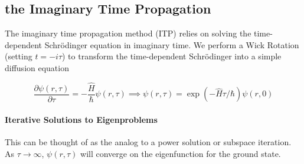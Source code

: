 \documentclass[a0b,landscape]{a0poster}
\begin{document}
\vspace{1cm} %


\begin{multicols}{3} %



\color{Black} %

\section*{the Imaginary Time Propagation}

The imaginary time propagation method (ITP) relies on solving the
time-dependent Schrödinger equation in imaginary time. We perform a Wick Rotation (setting \(t=-i\tau\)) to transform the time-dependent Schrödinger into a simple diffusion equation

\begin{equation}
\label{eq:itpSch}
\frac{\partial \psi(r,\tau)}{\partial
\tau}=-\frac{\hat{H}}{\hbar}\psi(r,\tau) \implies \psi(r,\tau)=\exp(-\hat{H}\tau/\hbar)\psi(r,0)
\end{equation}

\paragraph{Iterative Solutions to Eigenproblems}This can be thought of as the analog to a power solution or subspace iteration. As \(\tau\to\infty\), \(\psi(r,\tau)\) will converge on the eigenfunction for the ground state.



\end{multicols}
\end{document}
